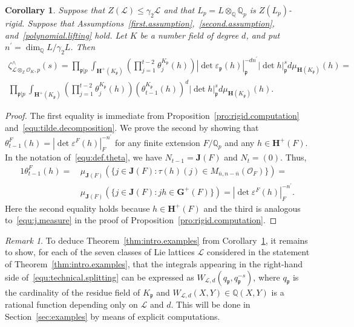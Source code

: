\documentclass[11pt,a4paper]{amsart}
\theoremstyle{plain}
\newtheorem{cor}[thm]{Corollary}
\theoremstyle{remark}
\newtheorem{rem}[thm]{Remark}
\newcommand{\Z}{\mathbb{Z}}
\newcommand{\Q}{\mathbb{Q}}
\newcommand{\tensor}{\otimes}
\newcommand{\p}{\mathfrak{p}}
\newcommand{\dimL}{n}
\newcommand{\overdim}{\overline{n}}
\def \p {\ensuremath{\mathfrak{p}}}
\begin{document}
\begin{cor} \label{cor:rigid.lifting}
Suppose that $Z(\mathcal L) \leq \gamma_2 \mathcal L$ and that $L_p = L \tensor_\Q \Q_p$ is $Z(L_p)$-rigid.  Suppose that Assumptions~\ref{first.assumption},~\ref{second.assumption}, and~\ref{polynomial.lifting} hold.  Let $K$ be a number field of degree $d$, and put $\dimL^\prime = \dim_{\Q} L/\gamma_2 L$.
Then
\begin{align} \label{equ:technical.splitting} \nonumber
\zeta^\wedge_{\mathcal{L} \tensor_\Z \mathcal{O}_K, p}(s) = \prod_{\p | p} \int_{\mathbf{H}^+(K_\p)} \left( \prod_{j = 1}^{t-2} \theta_j^{K_\p} (h) \right) |\det \varepsilon_\p(h)|_{\p}^{-d \dimL^\prime} |\det h|^s_{\p} d \mu_{\mathbf{H}(K_\p)}(h) = \\
\prod_{\p | p} \int_{\mathbf{H}^+(K_\p)} \left( \prod_{j = 1}^{t-2} \theta_j^{K_\p} (h) \right) (\theta_{t-1}^{K_\p}(h))^d |\det h|^s_{\p} d \mu_{\mathbf{H}(K_\p)}(h).
\end{align}
\end{cor}
\begin{proof}
The first equality is immediate from Proposition~\ref{pro:rigid.computation} and~\eqref{equ:tilde.decomposition}.  We prove the second by showing that $\theta_{t-1}^{F}(h) = | \det \varepsilon^F(h) |_F^{- \dimL^\prime}$ for any finite extension $F / \Q_p$ and any $h \in \mathbf{H}^+(F)$.  In the notation of~\eqref{equ:def.theta}, we have $N_{t-1} = \mathbf{J}(F)$ and $N_t = (0)$.  Thus, 
\begin{alignat*}{1}
\theta_{t-1}^F(h) = \, & \mu_{\mathbf{J}(F)} ( \{ j \in \mathbf{J}(F) : \tau(h)(j) \in M_{\overdim, \dimL - \overdim}(\mathcal{O}_F) \}) = \\
& \mu_{\mathbf{J}(F)} ( \{ j \in \mathbf{J}(F) : jh \in \mathbf{G}^+(F) \} ) = | \det \varepsilon^F(h) |_F^{- \dimL^\prime}.
\end{alignat*}
Here the second equality holds because $h \in \mathbf{H}^+(F)$ and the third is analogous to~\eqref{equ:j.measure} in the proof of Proposition~\ref{pro:rigid.computation}.
\end{proof}

\begin{rem} \label{rem:main.proof}
To deduce Theorem~\ref{thm:intro.examples} from Corollary~\ref{cor:rigid.lifting}, it remains to show, for each of the seven classes of Lie lattices $\mathcal{L}$ considered in the statement of Theorem~\ref{thm:intro.examples}, that the integrals appearing in the right-hand side of~\eqref{equ:technical.splitting} can be expressed as $W_{\mathcal{L},d}(q_\p,q_\p^{-s})$, where $q_\p$ is the cardinality of the residue field of $K_\p$ and $W_{\mathcal{L},d}(X,Y) \in \Q(X,Y)$ is a rational function depending only on $\mathcal{L}$ and $d$.  This will be done in Section~\ref{sec:examples} by means of explicit computations.
\end{rem}
\end{document}
